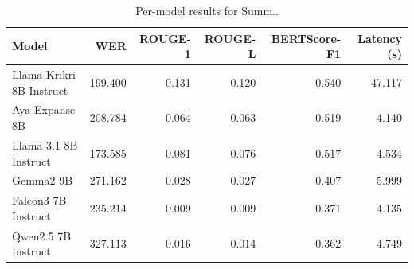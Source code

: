 \begin{table}[t]
\centering
\caption{Per-model results for Summ..}
\label{tab:appendix-summarization-analysis}
\begin{tabular}{lrrrrr}
\toprule
Model & WER & ROUGE-1 & ROUGE-L & BERTScore-F1 & Latency (s) \\
\midrule
Llama-Krikri 8B Instruct & 199.400 & 0.131 & 0.120 & 0.540 & 47.117 \\
Aya Expanse 8B & 208.784 & 0.064 & 0.063 & 0.519 & 4.140 \\
Llama 3.1 8B Instruct & 173.585 & 0.081 & 0.076 & 0.517 & 4.534 \\
Gemma2 9B & 271.162 & 0.028 & 0.027 & 0.407 & 5.999 \\
Falcon3 7B Instruct & 235.214 & 0.009 & 0.009 & 0.371 & 4.135 \\
Qwen2.5 7B Instruct & 327.113 & 0.016 & 0.014 & 0.362 & 4.749 \\
\bottomrule
\end{tabular}
\end{table}
